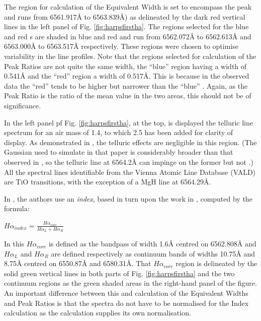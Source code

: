 The {\ha} region for calculation of the Equivalent Width is set to encompass the {\ha} peak and runs from 6561.917{\AA}
to 6563.839\AA) as delineated by the dark red vertical lines in the left panel of Fig. \ref{fig:harpsfirstha}.  The
regions selected for the blue and red \horn s are shaded in blue and red and run from 6562.072{\AA} to 6562.613{\AA} and
6563.000{\AA} to 6563.517{\AA} respectively. These regions were chosen to optimise variability in the line
profiles. Note that the regions selected for calculation of the Peak Ratios are not quite the same width, the ``blue''
{\horn} region having a width of 0.541{\AA} and the ``red'' {\horn} region a width of 0.517\AA. This is because in the
observed data the ``red'' {\horn} tends to be higher but narrower than the ``blue'' \horn. Again, as the Peak Ratio is
the ratio of the mean value in the two areas, this should not be of significance.

In the left panel pf Fig. \ref{fig:harpsfirstha}, at the top, is displayed the telluric line spectrum for an air mass of
1.4, to which 2.5 has been added for clarity of display. As demonstrated in \citet[Fig. 1]{reiners15}, the telluric
effects are negligible in this region. (The Gaussian used to simulate {\ha} in that paper is considerably broader than
that observed in \prox, so the telluric line at 6564.2{\AA} can impinge on the former but not \prox.) All the spectral
lines identifiable from the Vienna Atomic Line Database (VALD) are TiO transitions, with the exception of a MgH line at
6564.29\AA.

In \citet{suarezmascareno15}, the authors use an \textit{{\ha} index}, based in turn upon the work in
\citet{gomesdasilva11}, computed by the formula:

\begin{center}

$ H\alpha_{index} = \frac{H\alpha_{core}}{H\alpha_L + H\alpha_R} $

\end{center}

In this $ H\alpha_{core} $ is defined as the bandpass of width 1.6{\AA} centred on 6562.808{\AA} and $ H\alpha_L $ and
$H \alpha_R $ are defined respectively as continuum bands of widths 10.75{\AA} and 8.75{\AA} centred on 6550.87{\AA} and
6580.31\AA. That $ H\alpha_{core} $ region is delineated by the solid green vertical lines in both parts of
Fig. \ref{fig:harpsfirstha} and the two continuum regions as the green shaded areas in the right-hand panel of the
figure. An important difference between this and calculation of the Equivalent Widths and Peak Ratios is that the
spectra do not have to be normalised for the {\ha} Index calculation as the calculation supplies its own normalisation.

